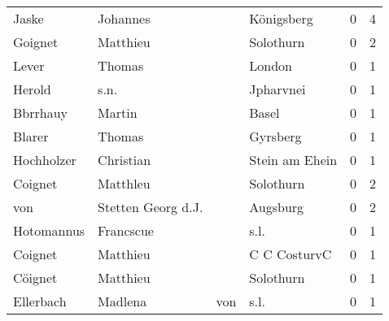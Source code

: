 \begin{tabular}{llllrr}
                    Jaske &                           Johannes &             &                                  Königsberg &          0 &         4 \\
                  Goignet &                           Matthieu &             &                                   Solothurn &          0 &         2 \\
                    Lever &                             Thomas &             &                                      London &          0 &         1 \\
                   Herold &                               s.n. &             &                                   Jpharvnei &          0 &         1 \\
                 Bbrrhauy &                             Martin &             &                                       Basel &          0 &         1 \\
                   Blarer &                             Thomas &             &                                    Gyrsberg &          0 &         1 \\
               Hochholzer &                          Christian &             &                              Stein am Ehein &          0 &         1 \\
                  Coignet &                           Matthleu &             &                                   Solothurn &          0 &         2 \\
                      von &                 Stetten Georg d.J. &             &                                    Augsburg &          0 &         2 \\
               Hotomannus &                          Francscue &             &                                        s.l. &          0 &         1 \\
                  Coignet &                           Matthieu &             &                                C C CosturvC &          0 &         1 \\
                  Cöignet &                           Matthieu &             &                                   Solothurn &          0 &         1 \\
                Ellerbach &                            Madlena &         von &                                        s.l. &          0 &         1 \\
\bottomrule
\end{tabular}

